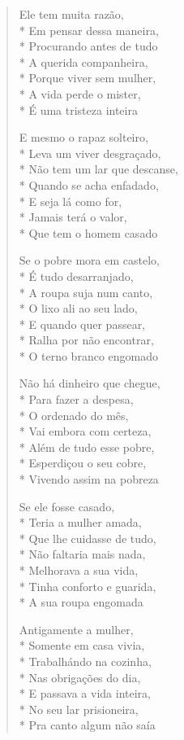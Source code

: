 \begin{verse}
Ele tem muita razão,\\*
Em pensar dessa maneira,\\*
Procurando antes de tudo\\*
A querida companheira,\\*
Porque viver sem mulher,\\*
A vida perde o mister,\\*
É uma tristeza inteira

E mesmo o rapaz solteiro,\\*
Leva um viver desgraçado,\\*
Não tem um lar que descanse,\\*
Quando se acha enfadado,\\*
E seja lá como for,\\*
Jamais terá o valor,\\*
Que tem o homem casado

Se o pobre mora em castelo,\\*
É tudo desarranjado,\\*
A roupa suja num canto,\\*
O lixo ali ao seu lado,\\*
E quando quer passear,\\*
Ralha por não encontrar,\\*
O terno branco engomado

Não há dinheiro que chegue,\\*
Para fazer a despesa,\\*
O ordenado do mês,\\*
Vai embora com certeza,\\*
Além de tudo esse pobre,\\*
Esperdiçou o seu cobre,\\*
Vivendo assim na pobreza

Se ele fosse casado,\\*
Teria a mulher amada,\\*
Que lhe cuidasse de tudo,\\*
Não faltaria mais nada,\\*
Melhorava a sua vida,\\*
Tinha conforto e guarida,\\*
A sua roupa engomada

Antigamente a mulher,\\*
Somente em casa vivia,\\*
Trabalhándo na cozinha,\\*
Nas obrigações do dia,\\*
E passava a vida inteira,\\*
No seu lar prisioneira,\\*
Pra canto algum não saía


\end{verse}
